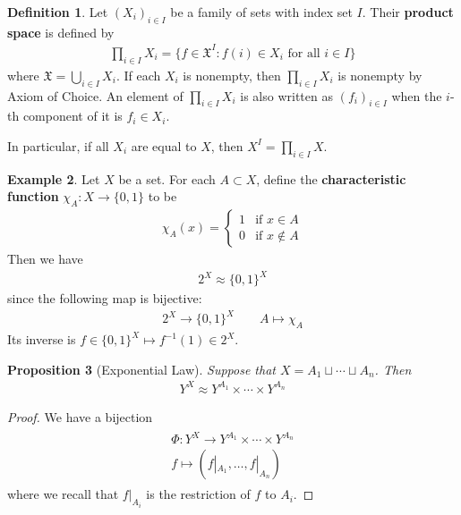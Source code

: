 \documentclass[12pt,b5paper,notitlepage]{article}
\theoremstyle{definition}
\newtheorem{df}{Definition}[section]
\newtheorem{eg}[df]{Example}
\theoremstyle{plain}
\newtheorem{pp}[df]{Proposition}
\newcommand{\fk}{\mathfrak}
\numberwithin{equation}{section}
\begin{document}
\begin{df}
Let $(X_i)_{i\in I}$ be a family of sets with index set $I$. Their \textbf{product space}   is defined by
\begin{align*}
\prod_{i\in I}X_i =\{f\in \fk X^I:f(i)\in X_i\text{ for all }i\in I \}
\end{align*}
where $\fk X=\bigcup_{i\in I}X_i$. If each $X_i$ is nonempty, then $\prod_{i\in I}X_i$ is nonempty by Axiom of Choice. An element of $\prod_{i\in I}X_i$ is also written as $(f_i)_{i\in I}$ when the $i$-th component of it is $f_i\in X_i$.
\end{df}

In particular, if all $X_i$ are equal to $X$, then $X^I=\prod_{i\in I}X$.



\begin{eg}\label{lb11}
Let $X$ be a set. For each $A\subset X$, define the \textbf{characteristic function}   $\chi_A:X\rightarrow\{0,1\}$ to be
\begin{align*}
\chi_A(x)=\left\{
\begin{array}{ll}
1&\text{if }x\in A\\
0&\text{if }x\notin A
\end{array}
\right.
\end{align*}
Then we have
\begin{align*}
2^X\approx \{0,1\}^X
\end{align*}
since the following map is bijective:
\begin{gather*}
2^X\rightarrow\{0,1\}^X\qquad A\mapsto\chi_A
\end{gather*}
Its inverse is $f\in\{0,1\}^X\mapsto f^{-1}(1)\in 2^X$.
\end{eg}

\begin{pp}[Exponential Law]\label{lb10}
Suppose that $X=A_1\sqcup\cdots\sqcup A_n$. Then
\begin{align*}
Y^X\approx Y^{A_1}\times \cdots\times Y^{A_n}
\end{align*}
\end{pp}

\begin{proof}
We have a bijection
\begin{gather}\label{eq9}
\begin{gathered}
\Phi:Y^X\rightarrow Y^{A_1}\times \cdots\times Y^{A_n}\\
f\mapsto (f|_{A_1},\dots,f|_{A_n})
\end{gathered}
\end{gather}
where we recall that $f|_{A_i}$ is the restriction of $f$ to $A_i$. 
\end{proof}
\end{document}
